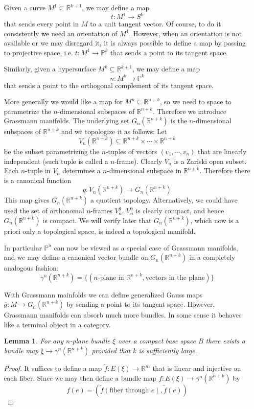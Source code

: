 \documentclass[12pt]{article}
\theoremstyle{plain}
\newtheorem{lemma}[equation]{Lemma}
\theoremstyle{definition}
\newcommand{\IP}{\mathbb{P}}
\newcommand{\IR}{\mathbb{R}}
\newcommand{\<}{\langle}
\renewcommand{\>}{\rangle}
\def\wt{\widetilde}
\newcommand{\wb}{\overline}
\newcommand{\tG}{G_n(\IR^{n + k})}
\begin{document}
Given a curve $M^1 \subseteq \IR^{k + 1}$, we may define a map $$t : M^1 \to S^k$$ that sends every point in $M$ to a unit tangent vector. Of course, to do it consistently we need an orientation of $M^1$. However, when an orientation is not available or we may disregard it, it is always possible to define a map by passing to projective space, i.e. $t : M^1 \to \IP^k$ that sends a point to its tangent space. 

Similarly, given a hypersurface $M^k \subseteq \IR^{k + 1}$, we may define a map $$ n : M^k \to \IP^k$$ that sends a point to the orthogonal complement of its tangent space. 

More generally we would like a map for $M^n \subseteq \IR^{n + k}$, so we need to space to parametrize the $n$-dimensional subspaces of $\IR^{n + k}$. Therefore we introduce Grassmann manifolds. The underlying set $G_n(\IR^{n + k})$ is the $n$-dimensional subspaces of $\IR^{n + k}$ and we topologize it as follows: Let $$V_n(\IR^{n + k}) \subseteq \IR^{n + k} \times \cdots \times \IR^{n + k}$$ be the subset parametrizing the $n$-tuples of vectors $(v_1, \cdots, v_n)$ that are linearly independent (such tuple is called a $n$-frame). Clearly $V_n$ is a Zariski open subset. Each $n$-tuple in $V_n$ determines a $n$-dimensional subspace in $\IR^{n + k}$. Therefore there is a canonical function 
$$ q : V_n(\IR^{n + k}) \to G_n (\IR^{n + k}) $$ 
This map gives $G_n (\IR^{n + k})$ a quotient topology. Alternatively, we could have used the set of orthonomal $n$-frames $V^0_{n}$. $V^0_{n}$ is clearly compact, and hence $G_n (\IR^{n + k})$ is compact. We will verify later that $G_n (\IR^{n + k})$, which now is a priori only a topological space, is indeed a topological manifold. 

In particular $\IP^n$ can now be viewed as a special case of Grassmann manifolds, and we may define a canonical vector bundle on $G_n(\IR^{n + k})$ in a completely analogous fashion: $$\gamma^n(\IR^{n + k}) = \{ (\text{$n$-plane in }\IR^{n + k}, \text{vectors in the plane}) \}$$ 

With Grassmann mainfolds we can define generalized Gauss maps $\wb{g} : M \to \tG$ by sending a point to its tangent space. However, Grassmann manifolds can absorb much more bundles. In some sense it behaves like a terminal object in a category. 

\begin{lemma}
\label{complemma}
For any $n$-plane bundle $\xi$ over a compact base space $B$ there exists a bundle map $\xi \to \gamma^n(\IR^{n + k})$ provided that $k$ is sufficiently large. 
\end{lemma}
\begin{proof}
It suffices to define a map $\wt{f} : E(\xi) \to \IR^m$ that is linear and injective on each fiber. Since we may then define a bundle map $f : E(\xi) \to \gamma^n(\IR^{n + k})$ by 
$$ f(e) = ( \wt{f}(\text{fiber through }e), \wt{f}(e) )$$

\end{proof}
\end{document}

